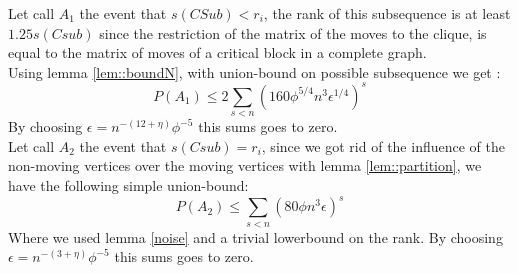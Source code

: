 Let call $A_1$ the event that $s(CSub) < r_i$, the rank of this subsequence is at least $1.25 s(Csub)$ since the restriction of the matrix of the moves to the clique, is equal to the matrix of moves of a critical block in a complete graph.\\
Using lemma \ref{lem::boundN}, with union-bound on possible subsequence we get :
\begin{equation*}
P(A_1) \leq 2 \sum_{s < n}(160\phi^{5/4}n^3\epsilon^{1/4})^s
\end{equation*}
By choosing $\epsilon = n^{-(12 + \eta)}\phi^{-5}$ this sums goes to zero.\\

Let call $A_2$ the event that $s(Csub) = r_i$, since we got rid of the influence of the non-moving vertices over the moving vertices with lemma \ref{lem::partition}, we have the following simple union-bound:
\begin{equation*}
P(A_2) \leq \sum_{s < n}(80\phi n^3 \epsilon)^s
\end{equation*}
Where we used lemma \ref{noise} and a trivial lowerbound on the rank.
By choosing $\epsilon = n^{-(3 + \eta)}\phi^{-5}$ this sums goes to zero. 

